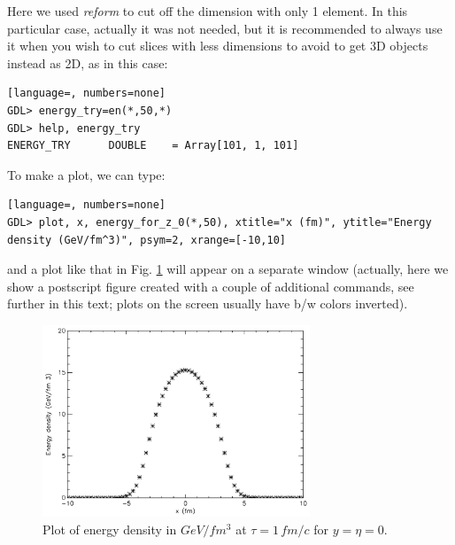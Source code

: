 Here we used \emph{reform} to cut off the dimension with only 1 element. In this particular case, actually it was not needed, but it is recommended to always use it when you wish to cut slices with less dimensions to avoid to get 3D objects instead as 2D, as in this case:
\begin{lstlisting}[language=, numbers=none]
GDL> energy_try=en(*,50,*)
GDL> help, energy_try
ENERGY_TRY      DOUBLE    = Array[101, 1, 101]
\end{lstlisting}
To make a plot, we can type:
\begin{lstlisting}[language=, numbers=none]
GDL> plot, x, energy_for_z_0(*,50), xtitle="x (fm)", ytitle="Energy density (GeV/fm^3)", psym=2, xrange=[-10,10]
\end{lstlisting}
and a plot like that in Fig. \ref{plot1} will appear on a separate window (actually, here we show a postscript figure created with a couple of additional commands, see further in this text; plots on the screen usually have b/w colors inverted).\\
\begin{figure}[!h]
 \centering
  \includegraphics[width=8cm]{images/plot1.pdf}
   \caption{Plot of energy density in $GeV/fm^3$ at $\tau=1\,fm/c$ for $y=\eta=0$.}
    \label{plot1}
\end{figure}

